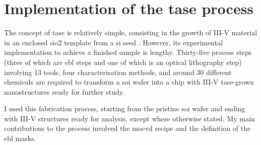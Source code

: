 \section{\texorpdfstring{Implementation of the \acs{tase} process}{Implementation of the TASE process}}
\label{chap:tase}

The concept of \acs{tase} is relatively simple, consisting in the growth of III-V material in an enclosed \acs{sio2} template from a \acs{si} seed \cite{Schmid2015, borgTASEp2018}. However, its experimental implementation to achieve a finished sample is lengthy. Thirty-five process steps (three of which are \acf{ebl} steps and one of which is an optical lithography step) involving 13 tools, four characterisation methods, and around 30 different chemicals are required to transform a \acf{soi} wafer into a chip with III-V \acs{tase}-grown nanostructures ready for further study. 

I used this fabrication process, starting from the pristine \acs{soi} wafer and ending with III-V structures ready for analysis, except where otherwise stated. My main contributions to the process involved the \acs{mocvd} recipe and the definition of the \acs{ebl} masks.

